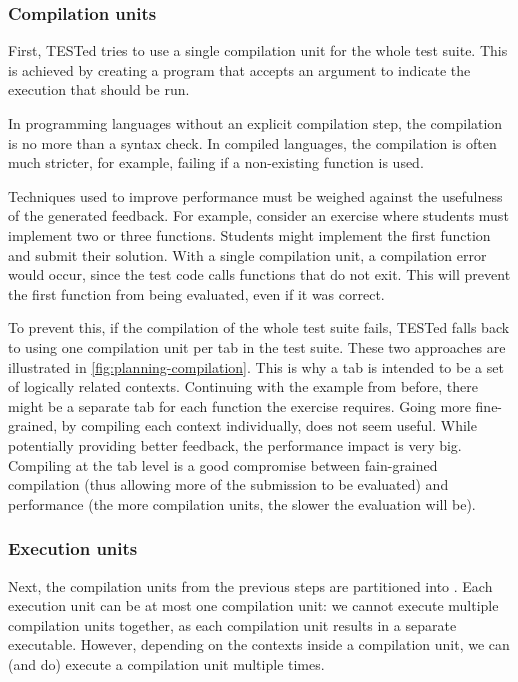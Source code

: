 \documentclass[../main]{subfiles}
\begin{document}
\subsubsection{Compilation units}
\label{subsubsec:compilation-units}

First, TESTed tries to use a single compilation unit for the whole test suite.
This is achieved by creating a program that accepts an argument to indicate the execution that should be run.

In programming languages without an explicit compilation step, the compilation is no more than a syntax check.
In compiled languages, the compilation is often much stricter, for example, failing if a non-existing function is used.

Techniques used to improve performance must be weighed against the usefulness of the generated feedback.
For example, consider an exercise where students must implement two or three functions.
Students might implement the first function and submit their solution.
With a single compilation unit, a compilation error would occur, since the test code calls functions that do not exit.
This will prevent the first function from being evaluated, even if it was correct.

To prevent this, if the compilation of the whole test suite fails, TESTed falls back to using one compilation unit per tab in the test suite.
These two approaches are illustrated in \cref{fig:planning-compilation}.
This is why a tab is intended to be a set of logically related contexts.
Continuing with the example from before, there might be a separate tab for each function the exercise requires.
Going more fine-grained, by compiling each context individually, does not seem useful.
While potentially providing better feedback, the performance impact is very big.
Compiling at the tab level is a good compromise between fain-grained compilation (thus allowing more of the submission to be evaluated) and performance (the more compilation units, the slower the evaluation will be).

\subsubsection{Execution units}

Next, the compilation units from the previous steps are partitioned into .
Each execution unit can be at most one compilation unit: we cannot execute multiple compilation units together,
as each compilation unit results in a separate executable.
However, depending on the contexts inside a compilation unit, we can (and do) execute a compilation unit multiple times.
\end{document}
